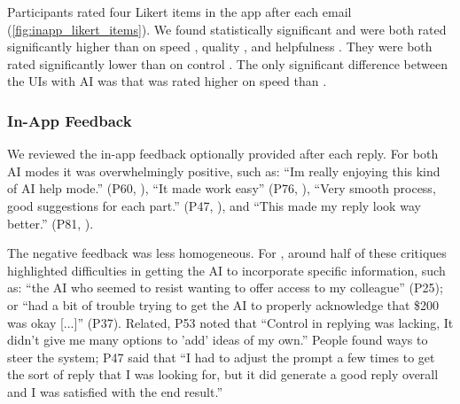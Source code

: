 Participants rated four Likert items in the app after each email (\cref{fig:inapp_likert_items}). 
We found statistically significant 
 \modeours{} and \modemail{} were both rated significantly higher than \modemanual{} on speed , quality , and helpfulness . They were both rated significantly lower than \modemanual{} on control . 
The only significant difference between the UIs with AI was that \modemail{} was rated higher on speed than \modeours{} . 


\subsubsection{In-App Feedback}
We reviewed the in-app feedback optionally provided after each reply.
For both AI modes it was overwhelmingly positive, such as: ``Im really enjoying this kind of AI help mode.'' (P60, \modemail), ``It made work easy'' (P76, \modemail), ``Very smooth process, good suggestions for each part.'' (P47, \modeours), and ``This made my reply look way better.'' (P81, \modeours).



The negative feedback was less homogeneous.
For \modemail, around half of these critiques highlighted difficulties in getting the AI to incorporate specific information, such as: ``the AI who seemed to resist wanting to offer access to my colleague'' (P25); or ``had a bit of trouble trying to get the AI to properly acknowledge that \$200 was okay [...]''  (P37). 
Related, P53 noted that ``Control in replying was lacking, It didn't give me many options to 'add' ideas of my own.''
People found ways to steer the system; P47 said that ``I had to adjust the prompt a few times to get the sort of reply that I was looking for, but it did generate a good reply overall and I was satisfied with the end result.''

